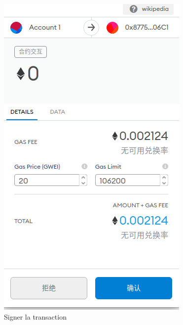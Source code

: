 \documentclass[14px]{article}
\begin{document}
\begin{figure}[H]
\begin{minipage}[H]{0.3\linewidth}
			\includegraphics[width=\textwidth]{Add2.png}
			\caption{Signer la transaction}
			\label{img2}
		\end{minipage}
		\begin{minipage}[H]{0.4\linewidth}
			\centering

\end{minipage}
\end{figure}
\end{document}

